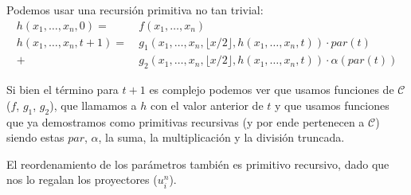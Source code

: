 \documentclass[fleqn, 11pt]{article}
\newcommand{\Ccur}{\mathcal{C}}
\begin{document}
Podemos usar una recursión primitiva no tan trivial:
\begin{align*}
	h(x_1, \dots, x_n, 0)
		=&\ f(x_1, \dots, x_n) \\
	h(x_1, \dots, x_n, t + 1)
		=&\ g_1(x_1, \dots, x_n, \lfloor x / 2 \rfloor,
		    h(x_1, \dots, x_n, t)) \cdot par(t) \\
		+&\ g_2(x_1, \dots, x_n, \lfloor x / 2 \rfloor,
		    h(x_1, \dots, x_n, t)) \cdot \alpha(par(t))
\end{align*}

Si bien el término para $t + 1$ es complejo podemos ver que usamos funciones de
$\Ccur$ ($f$, $g_1$, $g_2$), que llamamos a $h$ con el valor anterior de $t$ y
que usamos funciones que ya demostramos como primitivas recursivas (y por ende
pertenecen a $\Ccur$) siendo estas $par$, $\alpha$, la suma, la multiplicación
y la división truncada.

El reordenamiento de los parámetros también es primitivo recursivo, dado que
nos lo regalan los proyectores ($u^n_i$).
\end{document}
